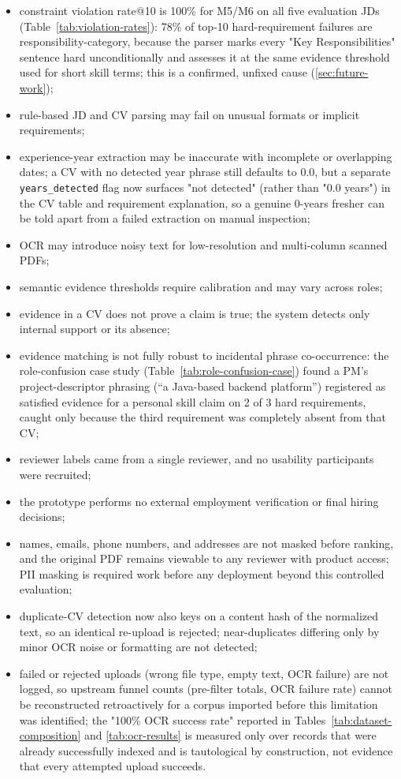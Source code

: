 \documentclass[12pt,a4paper,oneside]{report}
\begin{document}
\begin{itemize}
  \item constraint violation rate@10 is 100\% for M5/M6 on all five evaluation JDs (Table~\ref{tab:violation-rates}): 78\% of top-10 hard-requirement failures are responsibility-category, because the parser marks every "Key Responsibilities" sentence hard unconditionally and assesses it at the same evidence threshold used for short skill terms; this is a confirmed, unfixed cause (\cref{sec:future-work});
  \item rule-based JD and CV parsing may fail on unusual formats or implicit requirements;
  \item experience-year extraction may be inaccurate with incomplete or overlapping dates; a CV with no detected year phrase still defaults to 0.0, but a separate \texttt{years\_detected} flag now surfaces "not detected" (rather than "0.0 years") in the CV table and requirement explanation, so a genuine 0-years fresher can be told apart from a failed extraction on manual inspection;
  \item OCR may introduce noisy text for low-resolution and multi-column scanned PDFs;
  \item semantic evidence thresholds require calibration and may vary across roles;
  \item evidence in a CV does not prove a claim is true; the system detects only internal support or its absence;
  \item evidence matching is not fully robust to incidental phrase co-occurrence: the role-confusion case study (Table~\ref{tab:role-confusion-case}) found a PM's project-descriptor phrasing (``a Java-based backend platform'') registered as satisfied evidence for a personal skill claim on 2 of 3 hard requirements, caught only because the third requirement was completely absent from that CV;
  \item reviewer labels came from a single reviewer, and no usability participants were recruited;
  \item the prototype performs no external employment verification or final hiring decisions;
  \item names, emails, phone numbers, and addresses are not masked before ranking, and the original PDF remains viewable to any reviewer with product access; PII masking is required work before any deployment beyond this controlled evaluation;
  \item duplicate-CV detection now also keys on a content hash of the normalized text, so an identical re-upload is rejected; near-duplicates differing only by minor OCR noise or formatting are not detected;
  \item failed or rejected uploads (wrong file type, empty text, OCR failure) are not logged, so upstream funnel counts (pre-filter totals, OCR failure rate) cannot be reconstructed retroactively for a corpus imported before this limitation was identified; the "100\% OCR success rate" reported in Tables~\ref{tab:dataset-composition} and \ref{tab:ocr-results} is measured only over records that were already successfully indexed and is tautological by construction, not evidence that every attempted upload succeeds.
\end{itemize}
\end{document}
